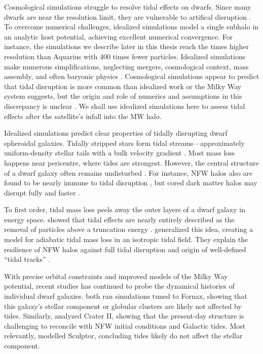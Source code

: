 Cosmological simulations struggle to resolve tidal effects on dwarfs.
Since many dwarfs are near the resolution limit, they are vulnerable to
artifical disruption
\citep[e.g.,][]{vandenbosch+2018, santos-santos+2025}. To overcome
numerical challenges, idealized simulations model a single subhalo in an
analytic host potential, achieving excellent numerical convergence. For
instance, the simulations we describe later in this thesis reach the
times higher resolution than Aquarius \citep{springel+2008} with 400
times fewer particles. Idealized simulations make numerous
simplifications, neglecting mergers, cosmological context, mass
assembly, and often baryonic physics
\citep[e.g.,][]{hayashi+2003, bullock+johnston2005, klimentowski+2009, ogiya+2019}.
Cosmological simulations appear to predict that tidal disruption is more
common than idealized work or the Milky Way system suggests, but the
origin and role of numerics and assumptions in this discrepancy is
unclear \citep{panithanpaisal+2021, shipp+2023, riley+2024}. We shall
use idealized simulations here to assess tidal effects after the
satellite's infall into the MW halo.

Idealized simulations predict clear properties of tidally disrupting
dwarf spheroidal galaxies. Tidally stripped stars form tidal
streams---approximately uniform-density stellar tails with a bulk
velocity gradient
\citep[e.g.,][]{moore+davis1994, johnston+spergel+hernquist1995, read+2006}.
Most mass loss happens near pericentre, where tides are strongest.
However, the central structure of a dwarf galaxy often remains
undisturbed \citep{oh+lin+aarseth1995, piatek+pryor1995}. For instance,
NFW halos also are found to be nearly immune to tidal disruption
\citep{EP2020}, but cored dark matter halos may disrupt fully and faster
\citep[e.g.,][]{penarrubia+2010, errani+2023a}.

To first order, tidal mass loss peels away the outer layers of a dwarf
galaxy in energy space.
\citet{drakos+taylor+benson2020, drakos+taylor+benson2022, amorisco2021}
showed that tidal effects are nearly entirely described as the removal
of particles above a truncation energy \citep[see
also][]{choi+weinberg+katz2009}. \citet{stucker+2023} generalized this
idea, creating a model for adiabatic tidal mass loss in an isotropic
tidal field. They explain the resilience of NFW halos against full tidal
disruption and origin of well-defined ``tidal tracks'' \citep[as
observed in][]{PNM2008, green+vandenbosch2019, EN2021}.

With precise orbital constraints and improved models of the Milky Way
potential, recent studies has continued to probe the dynamical histories
of individual dwarf galaxies.
\citet{borukhovetskaya+2022, dicintio+2024} both ran simulations tuned
to Fornax, showing that this galaxy's stellar component or globular
clusters are likely not affected by tides. Similarly,
\citet{borukhovetskaya+2022a} analyzed Crater II, showing that the
present-day structure is challenging to reconcile with NFW initial
conditions and Galactic tides. Most relevantly, \citet{iorio+2019}
modelled Sculptor, concluding tides likely do not affect the stellar
component.

